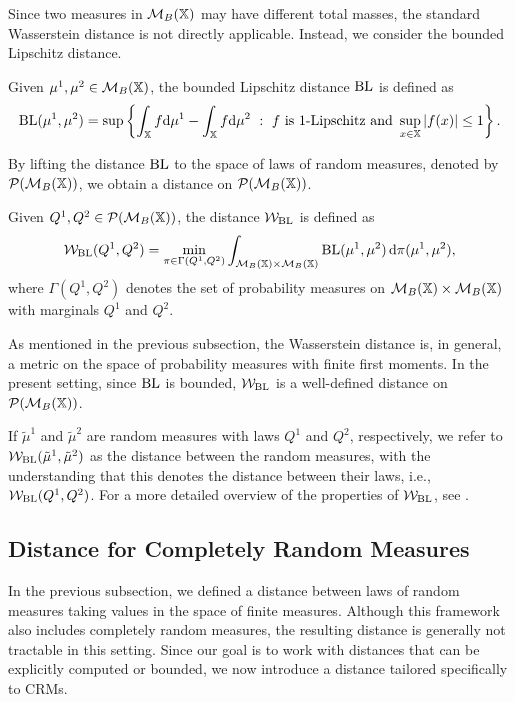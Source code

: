 Since two measures in $\mathcal{M}_B(\mathbb{X})$ may have different total masses, the standard Wasserstein distance is not directly applicable. Instead, we consider the bounded Lipschitz distance.

\begin{definition}\label{definition:bounded_lipschitz}
Given $\mu^1, \mu^2 \in \mathcal{M}_B(\mathbb{X})$, the bounded Lipschitz distance $\mathrm{BL}$ is defined as
\[
\mathrm{BL}(\mu^1, \mu^2) = \sup\left\{ \int_{\mathbb{X}} f \mathrm{d}\mu^1 - \int_{\mathbb{X}} f\mathrm{d}\mu^2 \ : \ f \text{ is } 1\text{-Lipschitz and }\sup_{x\in \mathbb{X}} |f(x)| \leq 1  \right\}.
\]
\end{definition}

By lifting the distance $\mathrm{BL}$ to the space of laws of random measures, denoted by $\mathcal{P}(\mathcal{M}_B(\mathbb{X}))$, we obtain a distance on $\mathcal{P}(\mathcal{M}_B(\mathbb{X}))$.

\begin{definition}
Given $Q^1, Q^2 \in \mathcal{P}(\mathcal{M}_B(\mathbb{X}))$, the distance $\mathcal{W}_{\mathrm{BL}}$ is defined as
\[
\mathcal{W}_{\mathrm{BL}}(Q^1, Q^2) = \min_{\pi \in \Gamma(Q^1, Q^2)} \int_{\mathcal{M}_B(\mathbb{X}) \times \mathcal{M}_B(\mathbb{X})} \mathrm{BL}(\mu^1,\mu^2)\,\mathrm{d}\pi(\mu^1,\mu^2),
\]
where $\Gamma(Q^1,Q^2)$ denotes the set of probability measures on $\mathcal{M}_B(\mathbb{X}) \times \mathcal{M}_B(\mathbb{X})$ with marginals $Q^1$ and $Q^2$.
\end{definition}

\begin{remark}\label{remark:wbl_is_distance}
As mentioned in the previous subsection, the Wasserstein distance is, in general, a metric on the space of probability measures with finite first moments. In the present setting, since $\mathrm{BL}$ is bounded, $\mathcal{W}_{\mathrm{BL}}$ is a well-defined distance on $\mathcal{P}(\mathcal{M}_B(\mathbb{X}))$.
\end{remark}

If $\tilde{\mu}^1$ and $\tilde{\mu}^2$ are random measures with laws $Q^1$ and $Q^2$, respectively, we refer to $\mathcal{W}_{\mathrm{BL}}(\tilde{\mu}^1, \tilde{\mu}^2)$ as the distance between the random measures, with the understanding that this denotes the distance between their laws, i.e., $\mathcal{W}_{\mathrm{BL}}(Q^1, Q^2)$. For a more detailed overview of the properties of $\mathcal{W}_{\mathrm{BL}}$, see \cite{catalano2026merging}.

\subsection{Distance for Completely Random Measures}\label{subsection:bnp_toolbox_distance_crm}

In the previous subsection, we defined a distance between laws of random measures taking values in the space of finite measures. Although this framework also includes completely random measures, the resulting distance is generally not tractable in this setting. Since our goal is to work with distances that can be explicitly computed or bounded, we now introduce a distance tailored specifically to CRMs.

